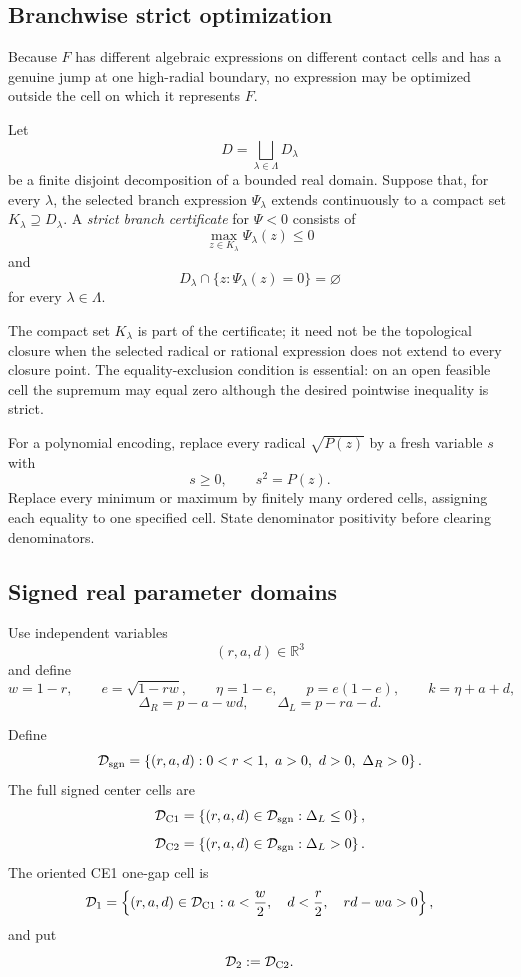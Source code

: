 \subsection{Branchwise strict optimization}

Because \(F\) has different algebraic expressions on different contact cells
and has a genuine jump at one high-radial boundary, no expression may be
optimized outside the cell on which it represents \(F\).

\begin{definition}
\label{def:s2-pure-strict-certificate}
Let
\[
 D=\bigsqcup_{\lambda\in\Lambda}D_\lambda
\]
be a finite disjoint decomposition of a bounded real domain.  Suppose that,
for every \(\lambda\), the selected branch expression
\(\Psi_\lambda\) extends continuously to a compact set
\(K_\lambda\supseteq D_\lambda\).  A \emph{strict branch certificate} for
\(\Psi<0\) consists of
\[
 \max_{z\in K_\lambda}\Psi_\lambda(z)\le0
\]
and
\[
 D_\lambda\cap\{z:\Psi_\lambda(z)=0\}=\varnothing
\]
for every \(\lambda\in\Lambda\).
\end{definition}

The compact set \(K_\lambda\) is part of the certificate; it need not be the
topological closure when the selected radical or rational expression does not
extend to every closure point.  The equality-exclusion condition is essential:
on an open feasible cell the supremum may equal zero although the desired
pointwise inequality is strict.

For a polynomial encoding, replace every radical \(\sqrt{P(z)}\) by a fresh
variable \(s\) with
\[
 s\ge0,\qquad s^2=P(z).
\]
Replace every minimum or maximum by finitely many ordered cells, assigning
each equality to one specified cell.  State denominator positivity before
clearing denominators.

\subsection{Signed real parameter domains}

Use independent variables
\[
 (r,a,d)\in\mathbb R^3
\]
and define
\[
 w=1-r,\qquad
 e=\sqrt{1-rw},\qquad
 \eta=1-e,\qquad
 p=e(1-e),\qquad
 k=\eta+a+d,
\]
\[
 \Delta_R=p-a-wd,
 \qquad
 \Delta_L=p-ra-d.
\]

\begin{definition}
\label{def:s2-pure-signed-domains}
Define
\[
 \mathcal D_{\rm sgn}
 =
 \left\{
 (r,a,d):
 0<r<1,\ a>0,\ d>0,\ \Delta_R>0
 \right\}.
\]
The full signed center cells are
\[
 \mathcal D_{\rm C1}
 =
 \left\{(r,a,d)\in\mathcal D_{\rm sgn}:\Delta_L\le0\right\},
\]
\[
 \mathcal D_{\rm C2}
 =
 \left\{(r,a,d)\in\mathcal D_{\rm sgn}:\Delta_L>0\right\}.
\]
The oriented CE1 one-gap cell is
\[
 \mathcal D_1
 =
 \left\{
 (r,a,d)\in\mathcal D_{\rm C1}:
 a<\frac w2,\quad d<\frac r2,\quad rd-wa>0
 \right\},
\]
and put
\[
 \mathcal D_2:=\mathcal D_{\rm C2}.
\]
\end{definition}

